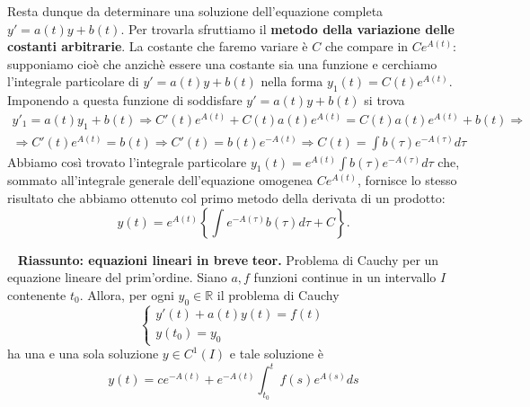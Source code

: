 \begin{itemize}
    \newline
    Resta dunque da determinare una soluzione dell'equazione completa $y' = a(t) y + b(t)$. Per trovarla sfruttiamo il \textbf{metodo della variazione delle costanti arbitrarie}. La costante che faremo variare è $C$ che compare in $Ce^{A(t)}$: supponiamo cioè che anzichè essere una costante sia una funzione e cerchiamo l'integrale particolare di $y' = a(t) y + b(t)$ nella forma $y_1(t) = C(t) e^{A(t)}$. Imponendo a questa funzione di soddisfare $y' = a(t) y + b(t)$ si trova
    \begin{align*}
        y'_1= a(t)y_1 + b(t) \Rightarrow C'(t) e^{A(t)} + C(t)a(t)e^{A(t)} = C(t) a(t) e^{A(t)} + b(t) \Rightarrow \\
        \Rightarrow C'(t) e^{A(t)} = b(t) \Rightarrow C'(t) = b(t) e^{-A(t)} \Rightarrow C(t) = \int b(\tau) e^{-A(\tau)} d \tau
    \end{align*}
    Abbiamo così trovato l'integrale particolare $y_1(t) = e^{A(t)} \int b(\tau) e^{-A(\tau)} d \tau$ che, sommato all'integrale generale dell'equazione omogenea $Ce^{A(t)}$, fornisce lo stesso risultato che abbiamo ottenuto col primo metodo della derivata di un prodotto:
    \[
        y(t) = e^{A(t)}\left\{ \int e^{-A(\tau)} b(\tau) d \tau + C \right\}.
    \]
\end{itemize}
\ \newline
\textbf{Riassunto: equazioni lineari in breve}\newline
\textbf{teor.} Problema di Cauchy per un equazione lineare del prim'ordine.\newline
Siano $a, f$ funzioni continue in un intervallo $I$ contenente $t_0$. Allora, per ogni $y_0 \in \mathbb{R}$ il problema di Cauchy
\[
    \begin{cases}
        y'(t) + a(t)y(t)= f(t)\\
        y(t_0) = y_0
    \end{cases}
\]
ha una e una sola soluzione $y \in C^1(I)$ e tale soluzione è
\[
    y(t) = ce^{-A(t)} + e^{-A(t)} \int_{t_0}^{t} f(s)e^{A(s)}ds
\]
